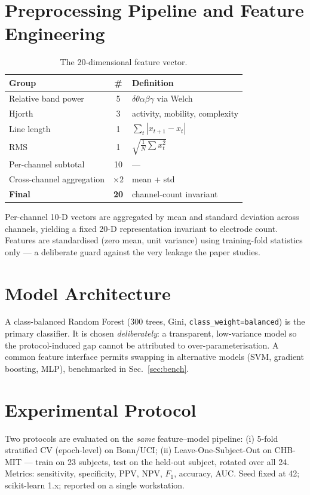 \documentclass[10pt,journal,twocolumn]{IEEEtran}
\begin{document}
\section{Preprocessing Pipeline and Feature Engineering}\label{sec:feat}
\begin{table}[h]\centering\caption{The 20-dimensional feature vector.}\label{tab:feat}
\begin{tabular}{lcl}\toprule
Group & \# & Definition\\\midrule
Relative band power & 5 & $\delta\theta\alpha\beta\gamma$ via Welch\\
Hjorth & 3 & activity, mobility, complexity\\
Line length & 1 & $\sum_t|x_{t+1}-x_t|$\\
RMS & 1 & $\sqrt{\frac1N\sum x_t^2}$\\\midrule
Per-channel subtotal & 10 & ---\\
Cross-channel aggregation & $\times2$ & mean + std\\\midrule
\textbf{Final} & \textbf{20} & channel-count invariant\\\bottomrule
\end{tabular}\end{table}
Per-channel 10-D vectors are aggregated by mean and standard deviation across channels, yielding a fixed 20-D representation invariant to electrode count. Features are standardised (zero mean, unit variance) using training-fold statistics only --- a deliberate guard against the very leakage the paper studies.

\section{Model Architecture}
A class-balanced Random Forest (300 trees, Gini, \texttt{class\_weight=balanced}) is the primary classifier. It is chosen \emph{deliberately}: a transparent, low-variance model so the protocol-induced gap cannot be attributed to over-parameterisation. A common feature interface permits swapping in alternative models (SVM, gradient boosting, MLP), benchmarked in Sec.~\ref{sec:bench}.

\section{Experimental Protocol}
Two protocols are evaluated on the \emph{same} feature--model pipeline: (i) 5-fold stratified CV (epoch-level) on Bonn/UCI; (ii) Leave-One-Subject-Out on CHB-MIT --- train on 23 subjects, test on the held-out subject, rotated over all 24. Metrics: sensitivity, specificity, PPV, NPV, $F_1$, accuracy, AUC. Seed fixed at 42; scikit-learn 1.x; reported on a single workstation.
\end{document}
